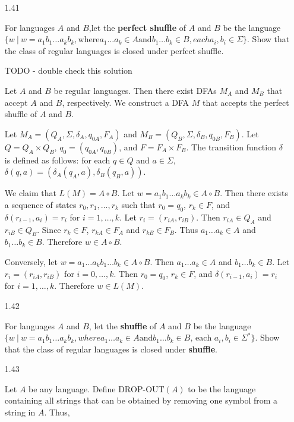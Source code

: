 \begin{enumerate}

    \item [1.41]

          For languages $A$ and $B$,let the \textbf{perfect shuffle} of $A$ and $B$ be the language $\{w~|~ w = a_1b_1\ldots a_kb_k , \text{where} a_1\ldots a_k \in A \text{and} b_1 \ldots b_k \in B, each a_i,b_i \in \Sigma\}$. Show that the class of regular languages is closed under perfect shuffle.

          TODO - double check this solution

          Let $A$ and $B$ be regular languages. Then there exist DFAs $M_A$ and $M_B$ that accept $A$ and $B$, respectively. We construct a DFA $M$ that accepts the perfect shuffle of $A$ and $B$.

          Let $M_A = (Q_A,\Sigma,\delta_A,q_{0A},F_A)$ and $M_B = (Q_B,\Sigma,\delta_B,q_{0B},F_B)$. Let $Q = Q_A \times Q_B$, $q_0 = (q_{0A},q_{0B})$, and $F = F_A \times F_B$. The transition function $\delta$ is defined as follows: for each $q \in Q$ and $a \in \Sigma$, $\delta(q,a) = (\delta_A(q_A,a),\delta_B(q_B,a))$.

          We claim that $L(M) = A \circ B$. Let $w = a_1b_1\ldots a_kb_k \in A \circ B$. Then there exists a sequence of states $r_0,r_1,\ldots,r_k$ such that $r_0 = q_0$, $r_k \in F$, and $\delta(r_{i-1},a_i) = r_i$ for $i = 1,\ldots,k$. Let $r_i = (r_{iA},r_{iB})$. Then $r_{iA} \in Q_A$ and $r_{iB} \in Q_B$. Since $r_k \in F$, $r_{kA} \in F_A$ and $r_{kB} \in F_B$. Thus $a_1\ldots a_k \in A$ and $b_1\ldots b_k \in B$. Therefore $w \in A \circ B$.

          Conversely, let $w = a_1\ldots a_kb_1\ldots b_k \in A \circ B$. Then $a_1\ldots a_k \in A$ and $b_1\ldots b_k \in B$. Let $r_i = (r_{iA},r_{iB})$ for $i = 0,\ldots,k$. Then $r_0 = q_0$, $r_k \in F$, and $\delta(r_{i-1},a_i) = r_i$ for $i = 1,\ldots,k$. Therefore $w \in L(M)$.


    \item [1.42]

          For languages $A$ and $B$, let the \textbf{shuffle} of $A$ and $B$ be the language $\{w~|~ w = a_1b_1\ldots a_kb_k, where a_1 \ldots a_k \in A \text{and} b_1 \ldots b_k \in B\text{, each }a_i,b_i \in \Sigma^\ast\}$. Show that the class of regular languages is closed under \textbf{shuffle}.

    \item [1.43]

          Let $A$ be any language. Define $\text{DROP-OUT}(A)$ to be the language containing all strings that can be obtained by removing one symbol from a string in $A$. Thus,


\end{enumerate}
